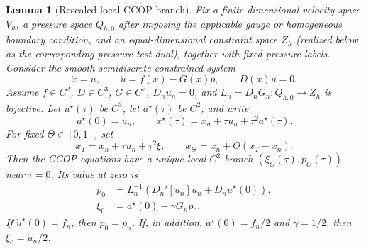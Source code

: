 \documentclass[11pt]{article}
\theoremstyle{plain}
\newtheorem{lemma}[theorem]{Lemma}
\theoremstyle{definition}
\theoremstyle{remark}
\newcommand{\Th}{\Theta}
\begin{document}
\begin{lemma}[Rescaled local CCOP branch]
\label{lem:regularized_local_ccop_branch}
Fix a finite-dimensional velocity space $V_h$, a pressure space $Q_{h,0}$
after imposing the applicable gauge or homogeneous boundary condition, and an
equal-dimensional constraint space $Z_h$ (realized below as the corresponding
pressure-test dual), together with fixed pressure labels.  Consider
the smooth semidiscrete constrained system
\begin{equation}
 \dot x=u,\qquad \dot u=f(x)-G(x)p,\qquad D(x)u=0.
 \label{eq:semidiscrete_constrained_flow}
\end{equation}
Assume $f\in C^2$, $D\in C^3$, $G\in C^2$, $D_nu_n=0$, and
$L_n=D_nG_n:Q_{h,0}\to Z_h$ is bijective.  Let
$u^\star(\tau)$ be $C^3$, let $a^\star(\tau)$ be $C^2$, and write
\begin{equation}
 u^\star(0)=u_n,
 \qquad
 x^\star(\tau)=x_n+\tau u_n+\tau^2a^\star(\tau).
 \label{eq:general_predictor_scaling}
\end{equation}
For fixed $\Th\in[0,1]$, set
\begin{equation}
 x_T=x_n+\tau u_n+\tau^2\xi,
 \qquad
 x_\Th=x_n+\Th(x_T-x_n).
 \label{eq:regularized_terminal_scaling}
\end{equation}
Then the CCOP equations have a unique local $C^2$ branch
$(\xi_\Th(\tau),p_\Th(\tau))$ near $\tau=0$.  Its value at zero is
\begin{align}
 p_0&=L_n^{-1}\left(D_n'[u_n]u_n+D_n\dot u^\star(0)\right),
 \label{eq:regularized_pressure_limit}\\
 \xi_0&=a^\star(0)-\gamma G_np_0.
 \label{eq:regularized_position_limit}
\end{align}
If $\dot u^\star(0)=f_n$, then $p_0=p_n$.  If, in addition,
$a^\star(0)=f_n/2$ and $\gamma=1/2$, then
$\xi_0=\dot u_n/2$.
\end{lemma}
\end{document}
